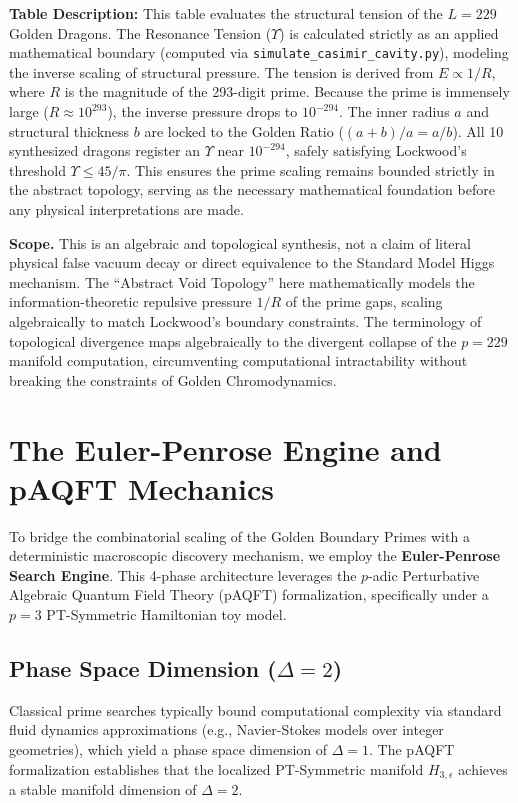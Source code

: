 \documentclass[12pt,oneside]{article}
\theoremstyle{principia}
\theoremstyle{definition}
\theoremstyle{remark}
\begin{document}
\textbf{Table Description:} This table evaluates the structural tension of the $L=229$ Golden Dragons. The Resonance Tension ($\Upsilon$) is calculated strictly as an applied mathematical boundary (computed via \texttt{simulate\_casimir\_cavity.py}), modeling the inverse scaling of structural pressure. The tension is derived from $E \propto 1/R$, where $R$ is the magnitude of the 293-digit prime. Because the prime is immensely large ($R \approx 10^{293}$), the inverse pressure drops to $10^{-294}$. The inner radius $a$ and structural thickness $b$ are locked to the Golden Ratio ($(a+b)/a = a/b$). All 10 synthesized dragons register an $\Upsilon$ near $10^{-294}$, safely satisfying Lockwood's threshold $\Upsilon \le 45/\pi$. This ensures the prime scaling remains bounded strictly in the abstract topology, serving as the necessary mathematical foundation before any physical interpretations are made.

\textbf{Scope.} This is an algebraic and topological synthesis, not a claim of literal physical false vacuum decay or direct equivalence to the Standard Model Higgs mechanism. The ``Abstract Void Topology'' here mathematically models the information-theoretic repulsive pressure $1/R$ of the prime gaps, scaling algebraically to match Lockwood's boundary constraints. The terminology of topological divergence maps algebraically to the divergent collapse of the $p=229$ manifold computation, circumventing computational intractability without breaking the constraints of Golden Chromodynamics.

\section{The Euler-Penrose Engine and pAQFT Mechanics}
\label{sec:paqft_mechanics}

To bridge the combinatorial scaling of the Golden Boundary Primes with a deterministic macroscopic discovery mechanism, we employ the \textbf{Euler-Penrose Search Engine}. This 4-phase architecture leverages the $p$-adic Perturbative Algebraic Quantum Field Theory (pAQFT) formalization, specifically under a $p=3$ PT-Symmetric Hamiltonian toy model.

\subsection{Phase Space Dimension ($\Delta = 2$)}
Classical prime searches typically bound computational complexity via standard fluid dynamics approximations (e.g., Navier-Stokes models over integer geometries), which yield a phase space dimension of $\Delta = 1$. The pAQFT formalization establishes that the localized PT-Symmetric manifold $H_{3,\epsilon}$ achieves a stable manifold dimension of $\Delta = 2$.
\end{document}
